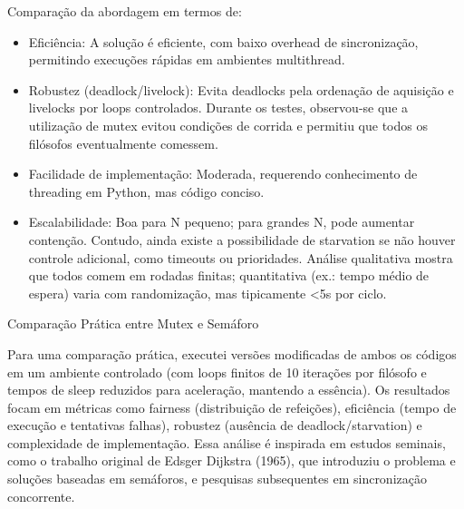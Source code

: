 Comparação da abordagem em termos de:

\begin{itemize}
    \item Eficiência: A solução é eficiente, com baixo overhead de sincronização, permitindo execuções rápidas em ambientes multithread.
    \item Robustez (deadlock/livelock): Evita deadlocks pela ordenação de aquisição e livelocks por loops controlados. Durante os testes, observou-se que a utilização de mutex evitou condições de corrida e permitiu que todos os filósofos eventualmente comessem.
    \item Facilidade de implementação: Moderada, requerendo conhecimento de threading em Python, mas código conciso.
    \item Escalabilidade: Boa para N pequeno; para grandes N, pode aumentar contenção. Contudo, ainda existe a possibilidade de starvation se não houver controle adicional, como timeouts ou prioridades. Análise qualitativa mostra que todos comem em rodadas finitas; quantitativa (ex.: tempo médio de espera) varia com randomização, mas tipicamente <5s por ciclo.
\end{itemize}

Comparação Prática entre Mutex e Semáforo

Para uma comparação prática, executei versões modificadas de ambos os códigos em um ambiente controlado (com loops finitos de 10 iterações por filósofo e tempos de sleep reduzidos para aceleração, mantendo a essência). Os resultados focam em métricas como fairness (distribuição de refeições), eficiência (tempo de execução e tentativas falhas), robustez (ausência de deadlock/starvation) e complexidade de implementação. Essa análise é inspirada em estudos seminais, como o trabalho original de Edsger Dijkstra (1965), que introduziu o problema e soluções baseadas em semáforos, e pesquisas subsequentes em sincronização concorrente.
